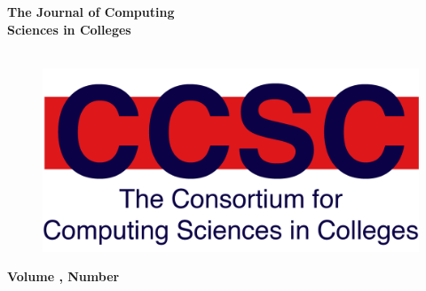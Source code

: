 \documentclass{article}
\begin{document}
\thispagestyle{empty}

\begin{textsf}

\begin{center}
\textbf{\Huge{
The Journal of Computing\\
Sciences in Colleges\\
}}\\
\end{center}

\vspace{30pt}

\begin{figure}[h]
\includegraphics[scale=0.7]{CCSC_logo.png}
\centering
\end{figure}

\vfill

{\parindent0pt
\textbf{\Large Volume \journalVolume, Number \journalNumber} \hfill
\textbf{\Large \journalMonth\ \journalYear}
}
\end{textsf}
\end{document}
